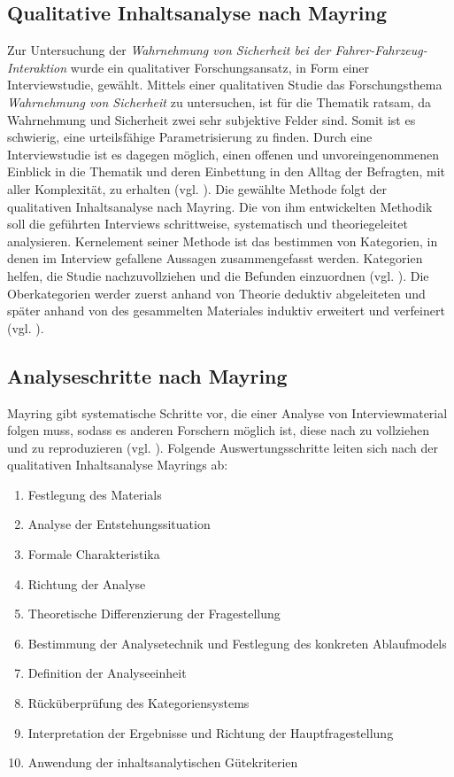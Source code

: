 \documentclass[12pt]{article}
\begin{document}
\subsection{Qualitative Inhaltsanalyse nach Mayring}

Zur Untersuchung der \emph{Wahrnehmung von Sicherheit bei der Fahrer-Fahrzeug-Interaktion} wurde ein qualitativer Forschungsansatz, in Form einer Interviewstudie, gewählt. Mittels einer qualitativen Studie das Forschungsthema \emph{Wahrnehmung von Sicherheit} zu untersuchen, ist für die Thematik ratsam, da Wahrnehmung und Sicherheit zwei sehr subjektive Felder sind. Somit ist es schwierig, eine urteilsfähige Parametrisierung zu finden. Durch eine Interviewstudie ist es dagegen möglich, einen offenen und unvoreingenommenen Einblick in die Thematik und deren Einbettung in den Alltag der Befragten, mit aller Komplexität, zu erhalten (vgl. \cite[10]{flick1995qualitative}).
Die gewählte Methode folgt der qualitativen Inhaltsanalyse nach Mayring. Die von ihm entwickelten Methodik soll die geführten Interviews schrittweise, systematisch und theoriegeleitet analysieren. Kernelement seiner Methode ist das bestimmen von Kategorien, in denen im Interview gefallene Aussagen zusammengefasst werden. Kategorien helfen, \glqq die Studie nachzuvollziehen und die Befunden einzuordnen\grqq{} (vgl. \cite[36]{meyen2011qualitative}). Die Oberkategorien werder zuerst anhand von Theorie deduktiv abgeleiteten und später anhand von des gesammelten Materiales induktiv erweitert und verfeinert (vgl. \cite[13]{mayring2010qualitative}).

\subsection {Analyseschritte nach Mayring}

Mayring gibt systematische Schritte vor, die einer Analyse von Interviewmaterial folgen muss, sodass es anderen Forschern möglich ist, diese nach zu vollziehen und zu reproduzieren (vgl. \cite[54]{mayring2010qualitative}). Folgende Auswertungsschritte leiten sich nach der qualitativen Inhaltsanalyse Mayrings ab:

\begin{enumerate}
  \item Festlegung des Materials
  \item Analyse der Entstehungssituation
  \item Formale Charakteristika
  \item Richtung der Analyse
  \item Theoretische Differenzierung der Fragestellung
  \item Bestimmung der Analysetechnik und Festlegung des konkreten Ablaufmodels
  \item Definition der Analyseeinheit
  \item Rücküberprüfung des Kategoriensystems
  \item Interpretation der Ergebnisse und Richtung der Hauptfragestellung
  \item Anwendung der inhaltsanalytischen Gütekriterien
\end{enumerate}
\end{document}
